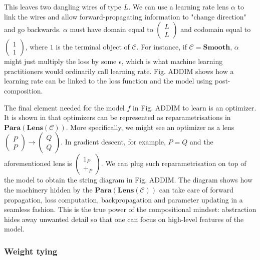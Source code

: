 \documentclass[12pt,a4paper,openright,twoside]{report}
\theoremstyle{plain}
\theoremstyle{definition}
\begin{document}
This leaves two dangling wires of type $L$. We can use a learning rate lens $\alpha$ to link the wires and allow forward-propagating information to "change direction" and go backwards. $\alpha$ must have domain equal to $\left( \begin{smallmatrix} L \\ L \end{smallmatrix} \right)$ and codomain equal to $\left(\begin{smallmatrix} 1 \\ 1 \end{smallmatrix}\right)$, where $1$ is the terminal object of $\mathcal{C}$. For instance, if $\mathcal{C} = \mathbf{Smooth}$, $\alpha$ might just multiply the loss by some $\epsilon$, which is what machine learning practitioners would ordinarily call learning rate. Fig. ADDIM shows how a learning rate can be linked to the loss function and the model using post-composition.


The final element needed for the model $f$ in Fig. ADDIM to learn is an optimizer. It is shown in \cite{cruttwell2022categorical} that optimizers can be represented as reparametrisations in $\mathbf{Para}(\mathbf{Lens}(\mathcal{C}))$. More specifically, we might see an optimizer as a lens $\left( \begin{smallmatrix} P \\ P \end{smallmatrix} \right) \to \left( \begin{smallmatrix} Q \\ Q \end{smallmatrix} \right)$. In gradient descent, for example, $P = Q$ and the aforementioned lens is $\left( \begin{smallmatrix} 1_P \\ +_P \end{smallmatrix} \right)$. We can plug such reparametrisation on top of the model to obtain the string diagram in Fig. ADDIM. The diagram shows how the machinery hidden by the $\mathbf{Para}(\mathbf{Lens}(\mathcal{C}))$ can take care of forward propagation, loss computation, backpropagation and parameter updating in a seamless fashion. This is the true power of the compositional mindset: abstraction hides away unwanted detail so that one can focus on high-level features of the model. 


\subsubsection{Weight tying}
\end{document}
